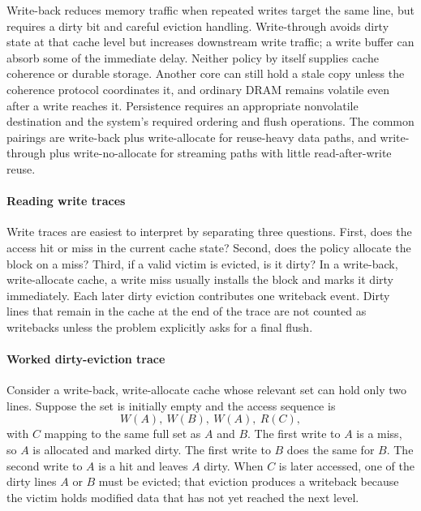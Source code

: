 Write-back reduces memory traffic when repeated writes target the same line, but requires a dirty bit and careful eviction handling.
Write-through avoids dirty state at that cache level but increases downstream write traffic; a write buffer can absorb some of the immediate delay.
Neither policy by itself supplies cache coherence or durable storage.
Another core can still hold a stale copy unless the coherence protocol coordinates it, and ordinary DRAM remains volatile even after a write reaches it.
Persistence requires an appropriate nonvolatile destination and the system's required ordering and flush operations.
The common pairings are write-back plus write-allocate for reuse-heavy data paths, and write-through plus write-no-allocate for streaming paths with little read-after-write reuse.

\paragraph{Reading write traces}\label{par:auto-020a}
Write traces are easiest to interpret by separating three questions.
First, does the access hit or miss in the current cache state?
Second, does the policy allocate the block on a miss?
Third, if a valid victim is evicted, is it dirty?
In a write-back, write-allocate cache, a write miss usually installs the block and marks it dirty immediately.
Each later dirty eviction contributes one writeback event.
Dirty lines that remain in the cache at the end of the trace are not counted as writebacks unless the problem explicitly asks for a final flush.

\paragraph{Worked dirty-eviction trace}\label{par:auto-020b}
Consider a write-back, write-allocate cache whose relevant set can hold only two lines.
Suppose the set is initially empty and the access sequence is
\[
    W(A),\ W(B),\ W(A),\ R(C),
\]
with $C$ mapping to the same full set as $A$ and $B$.
The first write to $A$ is a miss, so $A$ is allocated and marked dirty.
The first write to $B$ does the same for $B$.
The second write to $A$ is a hit and leaves $A$ dirty.
When $C$ is later accessed, one of the dirty lines $A$ or $B$ must be evicted; that eviction produces a writeback because the victim holds modified data that has not yet reached the next level.

